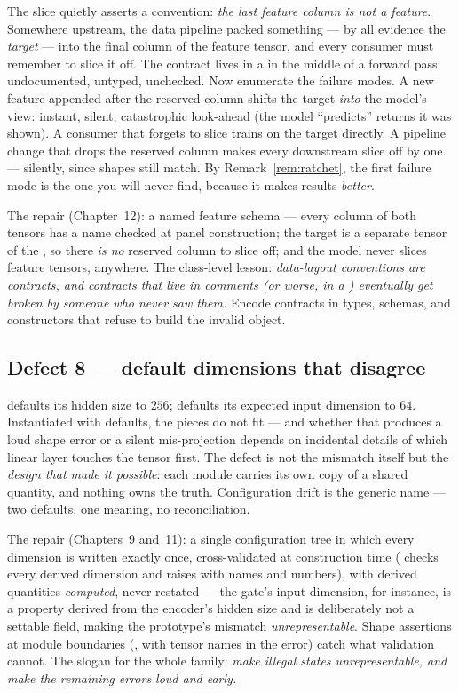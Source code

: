 The slice quietly asserts a convention: \emph{the last feature column is
not a feature}. Somewhere upstream, the data pipeline packed something ---
by all evidence the \emph{target} --- into the final column of the feature
tensor, and every consumer must remember to slice it off. The contract
lives in a  in the middle of a forward pass: undocumented,
untyped, unchecked. Now enumerate the failure modes. A new feature appended
after the reserved column shifts the target \emph{into} the model's view:
instant, silent, catastrophic look-ahead (the model ``predicts'' returns it
was shown). A consumer that forgets to slice trains on the target directly.
A pipeline change that drops the reserved column makes every downstream
slice off by one --- silently, since shapes still match. By
Remark~\ref{rem:ratchet}, the first failure mode is the one you will
never find, because it makes results \emph{better}.

The repair (Chapter~12): a named feature schema --- every column of both
tensors has a name checked at panel construction; the target is a separate
tensor of the , so there \emph{is no} reserved column to slice
off; and the model never slices feature tensors, anywhere. The class-level
lesson: \emph{data-layout conventions are contracts, and contracts that
live in comments (or worse, in a ) eventually get broken by
someone who never saw them.} Encode contracts in types, schemas, and
constructors that refuse to build the invalid object.

\subsection*{Defect 8 --- default dimensions that disagree}

 defaults its hidden size to $256$;  defaults its
expected input dimension to $64$. Instantiated with defaults, the pieces do
not fit --- and whether that produces a loud shape error or a silent
mis-projection depends on incidental details of which linear layer touches
the tensor first. The defect is not the mismatch itself but the
\emph{design that made it possible}: each module carries its own copy of a
shared quantity, and nothing owns the truth. Configuration drift is the
generic name --- two defaults, one meaning, no reconciliation.

The repair (Chapters~9 and~11): a single configuration tree in which every
dimension is written exactly once, cross-validated at construction time
( checks every derived dimension and raises with
names and numbers), with derived quantities \emph{computed}, never
restated --- the gate's input dimension, for instance, is a property
derived from the encoder's hidden size and is deliberately not a settable
field, making the prototype's mismatch \emph{unrepresentable}. Shape
assertions at module boundaries (, with tensor names in
the error) catch what validation cannot. The slogan for the whole family:
\emph{make illegal states unrepresentable, and make the remaining errors
loud and early.}

